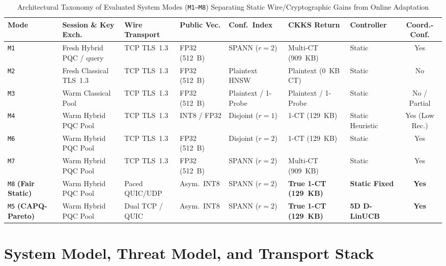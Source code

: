 \documentclass[10pt,journal,compsoc]{IEEEtran}
\begin{document}
\begin{table}[!t]
\centering
\caption{Architectural Taxonomy of Evaluated System Modes (\texttt{M1--M8}) Separating Static Wire/Cryptographic Gains from Online Adaptation}
\label{tab:taxonomy}
\footnotesize
\begin{adjustbox}{max width=\textwidth}
\begin{tabular}{lllllllc}
\toprule
\textbf{Mode} & \textbf{Session \& Key Exch.} & \textbf{Wire Transport} & \textbf{Public Vec.} & \textbf{Conf.\ Index} & \textbf{CKKS Return} & \textbf{Controller} & \textbf{Coord.-Conf.} \\
\midrule
\texttt{M1} & Fresh Hybrid PQC / query & TCP TLS~1.3 & FP32 (512~B) & SPANN ($r=2$) & Multi-CT (909~KB) & Static & Yes \\
\texttt{M2} & Fresh Classical TLS~1.3 & TCP TLS~1.3 & FP32 (512~B) & Plaintext HNSW & Plaintext (0~KB CT) & Static & No \\
\texttt{M3} & Warm Classical Pool & TCP TLS~1.3 & FP32 (512~B) & Plaintext / 1-Probe & Plaintext / 1-Probe & Static & No / Partial \\
\texttt{M4} & Warm Hybrid PQC Pool & TCP TLS~1.3 & INT8 / FP32 & Disjoint ($r=1$) & 1-CT (129~KB) & Static Heuristic & Yes (Low Rec.) \\
\texttt{M6} & Warm Hybrid PQC Pool & TCP TLS~1.3 & FP32 (512~B) & Disjoint ($r=2$) & 1-CT (129~KB) & Static & Yes \\
\texttt{M7} & Warm Hybrid PQC Pool & TCP TLS~1.3 & FP32 (512~B) & SPANN ($r=2$) & Multi-CT (909~KB) & Static & Yes \\
\texttt{M8} \textbf{(Fair Static)} & Warm Hybrid PQC Pool & Paced QUIC/UDP & Asym.\ INT8 & SPANN ($r=2$) & \textbf{True 1-CT (129~KB)} & \textbf{Static Fixed} & \textbf{Yes} \\
\texttt{M5} \textbf{(CAPQ-Pareto)} & Warm Hybrid PQC Pool & Dual TCP / QUIC & Asym.\ INT8 & SPANN ($r=2$) & \textbf{True 1-CT (129~KB)} & \textbf{5D D-LinUCB} & \textbf{Yes} \\
\bottomrule
\end{tabular}
\end{adjustbox}
\end{table}

\section{System Model, Threat Model, and Transport Stack}
\end{document}
